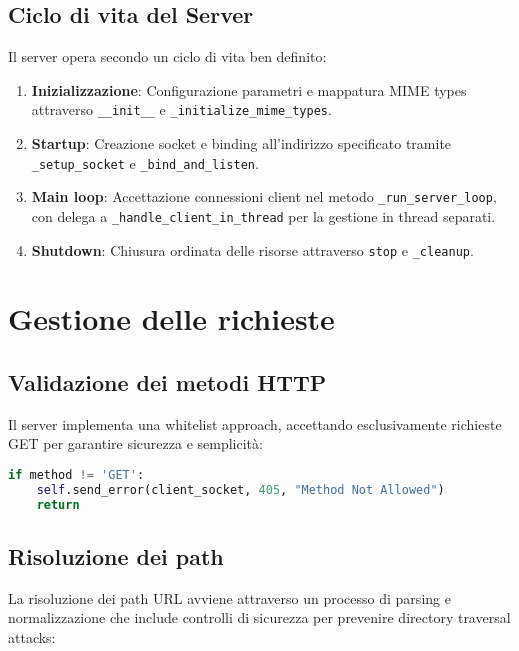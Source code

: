 \documentclass[a4paper,12pt]{report}
\begin{document}
\subsection{Ciclo di vita del Server}

Il server opera secondo un ciclo di vita ben definito:

\begin{enumerate}
    \item \textbf{Inizializzazione}: Configurazione parametri e mappatura MIME types attraverso \texttt{\_\_init\_\_} e \texttt{\_initialize\_mime\_types}.
    \item \textbf{Startup}: Creazione socket e binding all'indirizzo specificato tramite \texttt{\_setup\_socket} e \texttt{\_bind\_and\_listen}.
    \item \textbf{Main loop}: Accettazione connessioni client nel metodo \texttt{\_run\_server\_loop}, con delega a \texttt{\_handle\_client\_in\_thread} per la gestione in thread separati.
    \item \textbf{Shutdown}: Chiusura ordinata delle risorse attraverso \texttt{stop} e \texttt{\_cleanup}.
\end{enumerate}

\section{Gestione delle richieste}

\subsection{Validazione dei metodi HTTP}

Il server implementa una whitelist approach, accettando esclusivamente richieste GET per garantire sicurezza e semplicità:

\begin{lstlisting}[language=Python]
if method != 'GET':
    self.send_error(client_socket, 405, "Method Not Allowed")
    return
\end{lstlisting}

\subsection{Risoluzione dei path}

La risoluzione dei path URL avviene attraverso un processo di parsing e normalizzazione che include controlli di sicurezza per prevenire directory traversal attacks:
\end{document}
